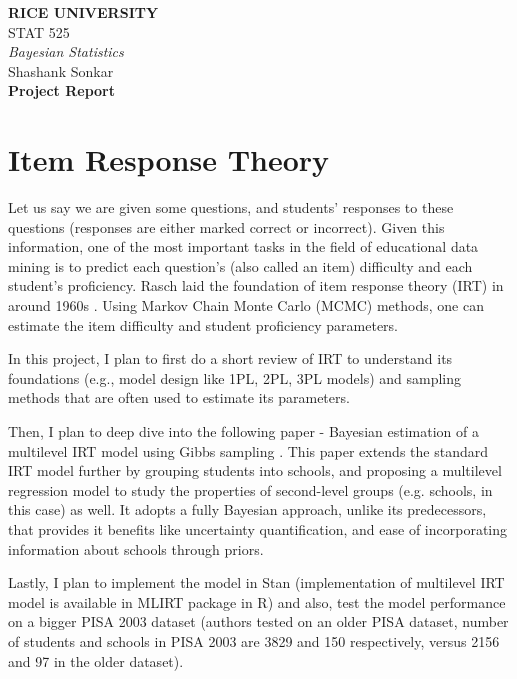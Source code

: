 \documentclass[12pt]{article}
\begin{document}
\begin{center}
{\bf RICE UNIVERSITY} \\
STAT 525 \\
{\it Bayesian Statistics} \\ 
\vspace{5pt}
Shashank Sonkar \\
\vspace{11pt}
{\bf Project Report}
\end{center}

\section{Item Response Theory}
Let us say we are given some questions, and students' responses to these questions (responses are either marked correct or incorrect). Given this information, one of the most important tasks in the field of educational data mining is to predict each question's (also called an item) difficulty and each student's proficiency. Rasch laid the foundation of item response theory (IRT) in around 1960s \cite{rasch1960probabilistic,rasch1966item}. Using Markov Chain Monte Carlo (MCMC) methods, one can estimate the item difficulty and student proficiency parameters.

In this project, I plan to first do a short review of IRT to understand its foundations (e.g., model design like 1PL, 2PL, 3PL models) and sampling methods that are often used to estimate its parameters.

Then, I plan to deep dive into the following paper - Bayesian estimation of a multilevel IRT model using Gibbs sampling \cite{fox2001bayesian}. This paper extends the standard IRT model further by grouping students into schools, and proposing a multilevel regression model to study the properties of second-level groups (e.g. schools, in this case) as well. It adopts a fully Bayesian approach, unlike its predecessors, that provides it benefits like uncertainty quantification, and ease of incorporating information about schools through priors.

Lastly, I plan to implement the model in Stan (implementation of multilevel IRT model is available in MLIRT package in R) and also, test the model performance on a bigger PISA 2003 dataset (authors tested on an older PISA dataset, number of students and schools in PISA 2003 are 3829 and 150 respectively, versus 2156 and 97 in the older dataset).
\end{document}
